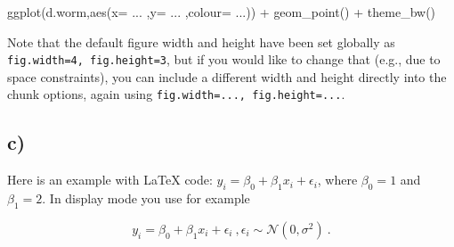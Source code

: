 \documentclass[
]{article}
\newenvironment{Shaded}{\begin{snugshade}}{\end{snugshade}}
\newcommand{\AttributeTok}[1]{\textcolor[rgb]{0.77,0.63,0.00}{#1}}
\newcommand{\FunctionTok}[1]{\textcolor[rgb]{0.00,0.00,0.00}{#1}}
\newcommand{\NormalTok}[1]{#1}
\newcommand{\SpecialCharTok}[1]{\textcolor[rgb]{0.00,0.00,0.00}{#1}}
\begin{document}
\begin{Shaded}
\begin{Highlighting}[]
\FunctionTok{ggplot}\NormalTok{(d.worm,}\FunctionTok{aes}\NormalTok{(}\AttributeTok{x=}\NormalTok{ ... ,}\AttributeTok{y=}\NormalTok{  ... ,}\AttributeTok{colour=}\NormalTok{ ...)) }\SpecialCharTok{+} \FunctionTok{geom\_point}\NormalTok{() }\SpecialCharTok{+} \FunctionTok{theme\_bw}\NormalTok{()}
\end{Highlighting}
\end{Shaded}

Note that the default figure width and height have been set globally as
\texttt{fig.width=4,\ fig.height=3}, but if you would like to change
that (e.g., due to space constraints), you can include a different width
and height directly into the chunk options, again using
\texttt{fig.width=...,\ fig.height=...}.

\hypertarget{c}{%
\subsection{c)}\label{c}}

Here is an example with LaTeX code:
\(y_i = \beta_0 + \beta_1 x_i + \epsilon_i\), where \(\beta_0=1\) and
\(\beta_1= 2\). In display mode you use for example

\[y_i = \beta_0 + \beta_1 x_i + \epsilon_i \ , \epsilon_i \sim \mathcal{N}(0,\sigma^2) \ .\]
\end{document}
